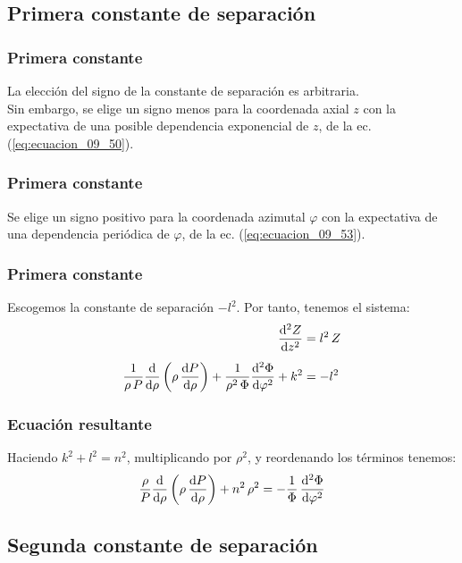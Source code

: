 \documentclass[12pt]{beamer}
\begin{document}
\subsection{Primera constante de separación}

\begin{frame}
\frametitle{Primera constante}
La elección del signo de la constante de separación es arbitraria.
\\
\bigskip
\pause
Sin embargo, se elige un signo menos para la coordenada axial $z$ con la expectativa de una posible dependencia exponencial de $z$, de la ec. (\ref{eq:ecuacion_09_50}).
\end{frame}
\begin{frame}
\frametitle{Primera constante}
Se elige un signo positivo para la coordenada azimutal $\varphi$ con la expectativa de una dependencia periódica de $\varphi$, de la ec. (\ref{eq:ecuacion_09_53}).
\end{frame}
\begin{frame}
\frametitle{Primera constante}
Escogemos la constante de separación $- l^{2}$. Por tanto, tenemos el sistema:
\pause
\begin{align}
\dv[2]{Z}{z} &= l^{2} \, Z \label{eq:ecuacion_09_50} \\[0.5em]
\dfrac{1}{\rho \, P} \dv{\rho} \left( \rho \, \dv{P}{\rho} \right) + \dfrac{1}{\rho^{2} \, \Phi} \dv[2]{\Phi}{\varphi} + k^{2} &= - l^{2} \label{eq:ecuacion_09_51}
\end{align}
\end{frame}
\begin{frame}
\frametitle{Ecuación resultante}
Haciendo $k^{2} + l^{2} = n^{2}$, multiplicando por $\rho^{2}$, y reordenando los términos tenemos:
\pause
\begin{align}
\dfrac{\rho}{P} \dv{\rho} \left( \rho \, \dv{P}{\rho} \right) + n^{2} \, \rho^{2} = - \dfrac{1}{\Phi} \, \dv[2]{\Phi}{\varphi}
\label{eq:ecuacion_09_52}
\end{align}
\end{frame}

\subsection{Segunda constante de separación}
\end{document}
